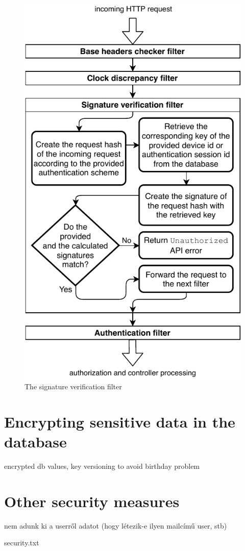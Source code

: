 \begin{figure}[!htb]
    \includegraphics[width=\textwidth]{figures/signature-verification-filter.pdf}
    \caption{The signature verification filter}
    \label{fig:signature-verification-filter}
\end{figure}

\section{Encrypting sensitive data in the database}

encrypted db values, key versioning to avoid birthday problem

\section{Other security measures}

nem adunk ki a userről adatot (hogy létezik-e ilyen mailcímű user, stb)

security.txt
